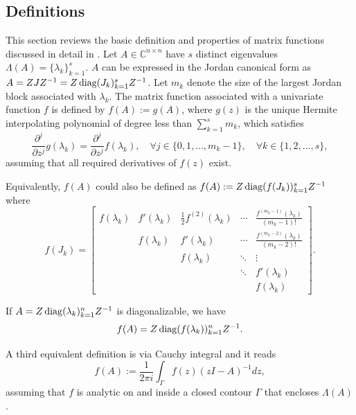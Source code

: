 \subsection{Definitions}
This section reviews the basic definition and properties of matrix functions
discussed in detail in \cite{higham2008functions}.
Let $A \in \mathbb{C}^{n \times n}$ have $s$ distinct eigenvalues $\Lambda(A) = \{\lambda_k\}_{k=1}^{s}$.
$A$ can be expressed in the Jordan canonical form as $A = ZJZ^{-1} = Z \operatorname{diag}(J_k)_{k=1}^{s}
Z^{-1}$. Let $m_k$ denote the size of the largest Jordan block associated
with $\lambda_k$. The matrix function associated with a univariate function $f$
is defined by $f(A) := g(A)$, where $g(z)$ is the unique Hermite interpolating
polynomial of degree less than $\sum_{k=1}^{s}{m_k}$, which satisfies
\begin{equation}
    \frac{\partial^j}{\partial z^j}g(\lambda_k) = \frac{\partial^j}{\partial z^j}f(\lambda_k),
    \quad \forall j \in \{0, 1, \dots, m_k-1\},
    \quad \forall k \in \{1, 2, \dots, s\},
\end{equation}
assuming that all required derivatives of $f(z)$ exist.

Equivalently, $f(A)$ could also be defined as $f(A) := Z \operatorname{diag}(f(J_k))_{k=1}^{s} Z^{-1}$ where
\begin{equation*}
    f(J_k) =
    \begin{bmatrix}
    f(\lambda_k) & f'(\lambda_k)  & \frac{1}{2} f^{(2)}(\lambda_k) & \cdots & \frac{f^{(m_k-1)}(\lambda_k)}{(m_k - 1)!}\\
    & f(\lambda_k) & f'(\lambda_k) & \cdots & \frac{f^{(m_k-2)}(\lambda_k)}{(m_k - 2)!} \\
    &  & f(\lambda_k) & \ddots & \vdots \\
    &  &  & \ddots & f'(\lambda_k)\\
    &  &  &  & f(\lambda_k)
    \end{bmatrix}.
\end{equation*}

If $A = Z \operatorname{diag}(\lambda_k)_{k=1}^{n} Z^{-1}$ is diagonalizable, we have
\begin{equation}
    \label{eq:matrixfunctiondiagonal}
    f(A) = Z \operatorname{diag}(f(\lambda_k))_{k=1}^{n} Z^{-1}.
\end{equation}

A third equivalent definition is via Cauchy integral and it reads
\begin{equation}
    f(A) := \frac{1}{2 \pi i} \int_{\Gamma}{f(z)(zI - A)^{-1} dz},
\end{equation}
assuming that $f$ is analytic on and inside a closed contour $\Gamma$ that encloses $\Lambda(A)$.

